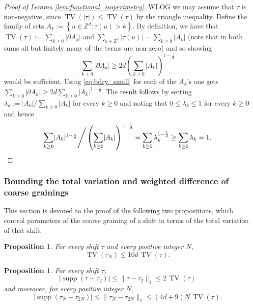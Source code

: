 \documentclass[11pt, reqno]{amsart}
\newtheorem{proposition}[theorem]{Proposition}
\newcommand{\Z}{\mathbb{Z}}
\DeclareMathOperator{\supp}{supp}
\DeclareMathOperator{\TV}{TV}
\numberwithin{equation}{section}
\begin{document}
\begin{proof}[Proof of Lemma \ref{lem:functional_isoperimetry}]
WLOG we may assume that $\tau$ is non-negative, since $\TV(|\tau|) \leq \TV(\tau)$ by the triangle inequality.
Define the family of sets $A_{k}:= \left\{u \in \Z^{d}\colon  \tau(u)>k \right\}$. 
By definition, we have that 
$\TV(\tau):= \sum_{k\geq 0} |\partial A_k|$ and $\sum_{u\in \Z^{d}} |\tau(u)| = \sum_{k\geq 0}|A_k |$ (note that in both sums all but finitely many of the terms are non-zero) and so showing 
\begin{equation*}
\sum_{k \geq 0}|\partial A_k| \geq 
2d \left( \sum_{k\geq 0}|A_k | \right) ^{1-\frac{1}{d}} 
\end{equation*}
would be sufficient.
Using \eqref{eq:bdry_small} for each of the $A_k$'s one gets $\sum_{k\geq 0}|\partial A_k| \geq 2d  \sum_{k\geq 0} 
|A_k |^{1-\frac{1}{d}}$. 
The result follows by setting $\lambda_k:=\lvert A_k\rvert/\sum_{k\geq 0}\lvert A_k\rvert$ for every $k\geq 0$ and noting that $0\leq\lambda_k\leq 1$ for every $k\geq 0$ and hence 
\begin{equation*}
\sum_{k\geq 0}\lvert A_k\rvert^{1-\frac{1}{d}}\Bigg/\left(\sum_{k\geq 0}\lvert A_k\rvert\right)^{1-\frac{1}{d}}=\sum_{k\geq 0}\lambda_k^{1-\frac{1}{d}}\geq\sum_{k\geq 0}\lambda_k=1.      \qedhere\end{equation*}
\end{proof}

\subsubsection{Bounding the total variation and weighted difference of coarse grainings}
\label{subsubsec:bounds_coarse}

This section is devoted to the proof of the following two propositions, which control parameters of the coarse graining of a shift in terms of the total variation of that shift.

\begin{proposition}\label{prop:functional_bdry}
For every shift $\tau$ and every positive integer $N$, 
$$
\TV(\tau_N) \leq 10d \, \TV(\tau). 
$$
\end{proposition}

\begin{proposition}\label{prop:functional_diff}
For every shift $\tau$,
$$
\lvert\supp(\tau-\tau_2)\rvert\leq\lVert \tau-\tau_2\rVert_1
\leq 2\, \TV(\tau) 
$$
and moreover, for every positive integer $N$,
$$
\lvert\supp(\tau_N-\tau_{2N})\rvert\leq\lVert \tau_N-\tau_{2N}\rVert_1
\leq (4d+9)N\, \TV(\tau). 
$$
\end{proposition}
\end{document}
